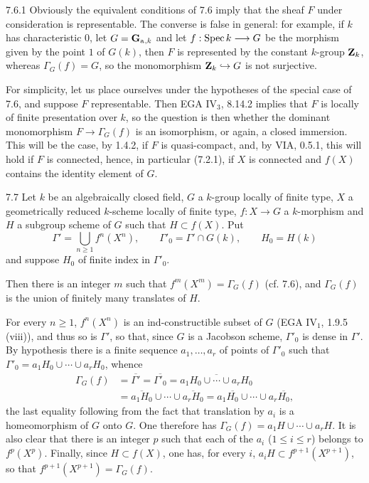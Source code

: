 \begin{remark}{7.6.1}\label{VIB.7.6.1}
Obviously the equivalent conditions of 7.6 imply that the sheaf $F$ under consideration is representable. The converse is false in general: for example, if $k$ has characteristic $0$, let $G=\mathbf{G}_{\mathrm{a}}{}_{,k}$ and let $f:\operatorname{Spec} k\longrightarrow G$ be the morphism given by the point $1$ of $G(k)$, then $F$ is represented by the constant $k$-group $\mathbf{Z}_k$, whereas $\Gamma_G(f)=G$, so the monomorphism $\mathbf{Z}_k\hookrightarrow G$ is not surjective.

For simplicity, let us place ourselves under the hypotheses of the special case of 7.6, and suppose $F$ representable. Then EGA IV$_3$, 8.14.2 implies that $F$ is locally of finite presentation over $k$, so the question is then whether the dominant monomorphism $F\to\Gamma_G(f)$ is an isomorphism, or again, a closed immersion. This will be the case, by 1.4.2, if $F$ is quasi-compact, and, by VIA, 0.5.1, this will hold if $F$ is connected, hence, in particular (7.2.1), if $X$ is connected and $f(X)$ contains the identity element of $G$.
\end{remark}

\begin{lemma}{7.7}\label{VIB.7.7}
Let $k$ be an algebraically closed field, $G$ a $k$-group locally of finite type, $X$ a geometrically reduced $k$-scheme locally of finite type, $f:X\to G$ a $k$-morphism and $H$ a subgroup scheme of $G$ such that $H\subset f(X)$. Put
\[
\Gamma'=\bigcup_{n\geq1}f^n(X^n),\qquad\Gamma'_0=\Gamma'\cap G(k),\qquad H_0=H(k)
\]
and suppose $H_0$ of finite index in $\Gamma'_0$.

Then there is an integer $m$ such that $f^m(X^m)=\Gamma_G(f)$ (cf. 7.6), and $\Gamma_G(f)$ is the union of finitely many translates of $H$.
\end{lemma}
For every $n\geq1$, $f^n(X^n)$ is an ind-constructible subset of $G$ (EGA IV$_1$, 1.9.5 (viii)), and thus so is $\Gamma'$, so that, since $G$ is a Jacobson scheme, $\Gamma'_0$ is dense in $\Gamma'$. By hypothesis there is a finite sequence $a_1,\ldots,a_r$ of points of $\Gamma'_0$ such that $\Gamma'_0=a_1H_0\cup\cdots\cup a_rH_0$, whence
\begin{align*}
\Gamma_G(f)&=\overline{\Gamma'}=\overline{\Gamma'_0}=\overline{a_1H_0\cup\cdots\cup a_rH_0}\\
&=\overline{a_1H_0}\cup\cdots\cup\overline{a_rH_0}=a_1\overline{H_0}\cup\cdots\cup a_r\overline{H_0},
\end{align*}
the last equality following from the fact that translation by $a_i$ is a homeomorphism of $G$ onto $G$. One therefore has $\Gamma_G(f)=a_1H\cup\cdots\cup a_rH$. It is also clear that there is an integer $p$ such that each of the $a_i$ ($1\leq i\leq r$) belongs to $f^p(X^p)$. Finally, since $H\subset f(X)$, one has, for every $i$, $a_iH\subset f^{p+1}(X^{p+1})$, so that $f^{p+1}(X^{p+1})=\Gamma_G(f)$.

